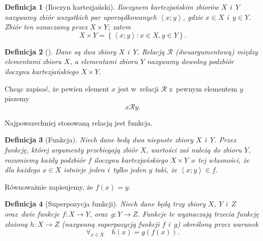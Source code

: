 \documentclass[12pt,a4paper]{report}
\newtheorem{definition}{Definicja}[chapter]
\newcommand{\parauporzadkowana}[2]{\left\langle {#1}; {#2} \right\rangle}
\newcommand{\zbior}[1]{\left\lbrace {#1} \right\rbrace }
\begin{document}
\begin{definition}[Iloczyn kartezjański{\citep[Sec 3.4]{kuratowski1966wstkep}}]
Iloczynem kartezjańskim zbiorów $X$ i~$Y$ nazywamy zbiór wszystkich par uporządkowanych $\parauporzadkowana{x}{y}$, gdzie $x \in X$ i~$y \in Y$. Zbiór ten oznaczamy przez $ X \times Y$; zatem
\begin{equation*}
X \times Y= \zbior{\parauporzadkowana{x}{y}:  x\in X  , y \in Y}.
\end{equation*} 

\end{definition}

\begin{definition}[{\citep[Sec 6.1 Def. 6.1]{kraszewski2007wstkep}}]
Dane są dwa zbiory $X$ i~$Y$. Relacją $\mathcal{R}$ (dwuargumentową) między elementami zbioru $X$, a elementami zbioru $Y$ nazywamy dowolny podzbiór iloczynu kartezjańskiego $X \times Y$.
\end{definition}
Chcąc zapisać, że pewien element $x$ jest w~relacji $\mathcal{R}$ z~pewnym elementem $y$ piszemy
$$
x\mathcal{R}y.
$$

Najpowszechniej stosowaną relacją jest funkcja.

\begin{definition}[Funkcja{\citep[Sec 4.1]{kuratowski1966wstkep}}]
Niech dane bedą dwa niepuste zbiory $X$ i~$Y$. Przez funkcję, której argumenty przebiegają zbiór $X$, wartości zaś należą do zbioru $Y$, rozumiemy każdy podzbiór $f$ iloczynu kartezjańskiego $X \times Y$ o~tej własności, że dla każdego $x \in X$ istnieje jeden i~tylko jeden $y$ taki, że $\parauporzadkowana{x}{y} \in f$. 

\end{definition}

Równoważnie zapisujemy, że $f(x)=y$.

\begin{definition}[Superpozycja funkcji{\citep[Sec 4.2 Def. 1.]{kuratowski1966wstkep}}]
Niech dane będą trzy zbiory $X$, $Y$ i~$Z$ oraz~dwie funkcje $f:X\to Y$, oraz~$g:Y\to Z$. Funkcje te wyznaczają trzecia funkcję złożoną $h:X\to Z$ (nazywaną superpozycją funkcji $f$ i~$g$) określoną przez warunek
\begin{equation*}
\forall_{x \in X} \quad h(x)=g(f(x)).
\end{equation*}
\end{definition}
\end{document}
